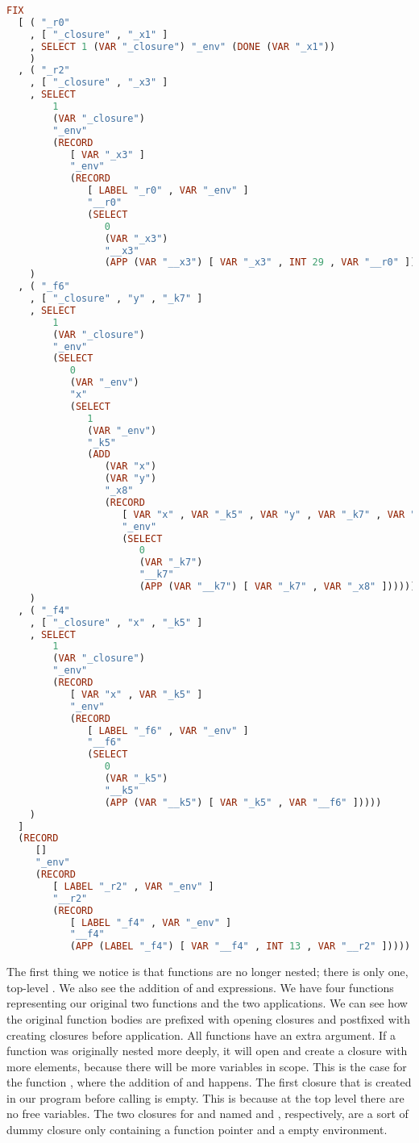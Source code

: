 {\begin{lstlisting}[language=Haskell]
FIX
  [ ( "_r0"
    , [ "_closure" , "_x1" ]
    , SELECT 1 (VAR "_closure") "_env" (DONE (VAR "_x1"))
    )
  , ( "_r2"
    , [ "_closure" , "_x3" ]
    , SELECT
        1
        (VAR "_closure")
        "_env"
        (RECORD
           [ VAR "_x3" ]
           "_env"
           (RECORD
              [ LABEL "_r0" , VAR "_env" ]
              "__r0"
              (SELECT
                 0
                 (VAR "_x3")
                 "__x3"
                 (APP (VAR "__x3") [ VAR "_x3" , INT 29 , VAR "__r0" ]))))
    )
  , ( "_f6"
    , [ "_closure" , "y" , "_k7" ]
    , SELECT
        1
        (VAR "_closure")
        "_env"
        (SELECT
           0
           (VAR "_env")
           "x"
           (SELECT
              1
              (VAR "_env")
              "_k5"
              (ADD
                 (VAR "x")
                 (VAR "y")
                 "_x8"
                 (RECORD
                    [ VAR "x" , VAR "_k5" , VAR "y" , VAR "_k7" , VAR "_x8" ]
                    "_env"
                    (SELECT
                       0
                       (VAR "_k7")
                       "__k7"
                       (APP (VAR "__k7") [ VAR "_k7" , VAR "_x8" ]))))))
    )
  , ( "_f4"
    , [ "_closure" , "x" , "_k5" ]
    , SELECT
        1
        (VAR "_closure")
        "_env"
        (RECORD
           [ VAR "x" , VAR "_k5" ]
           "_env"
           (RECORD
              [ LABEL "_f6" , VAR "_env" ]
              "__f6"
              (SELECT
                 0
                 (VAR "_k5")
                 "__k5"
                 (APP (VAR "__k5") [ VAR "_k5" , VAR "__f6" ]))))
    )
  ]
  (RECORD
     []
     "_env"
     (RECORD
        [ LABEL "_r2" , VAR "_env" ]
        "__r2"
        (RECORD
           [ LABEL "_f4" , VAR "_env" ]
           "__f4"
           (APP (LABEL "_f4") [ VAR "__f4" , INT 13 , VAR "__r2" ]))))
\end{lstlisting}

The first thing we notice is that functions are no longer nested; there is only one, top-level . We also see the addition of  and  expressions. We have four functions representing our original two functions and the two applications. We can see how the original function bodies are prefixed with opening closures and postfixed with creating closures before application. All functions have an extra  argument. If a function was originally nested more deeply, it will open and create a closure with more elements, because there will be more variables in scope. This is the case for the function , where the addition of  and  happens. The first closure that is created in our program before calling  is empty. This is because at the top level there are no free variables. The two closures for  and  named  and , respectively, are a sort of dummy closure only containing a function pointer and a empty environment.

}

